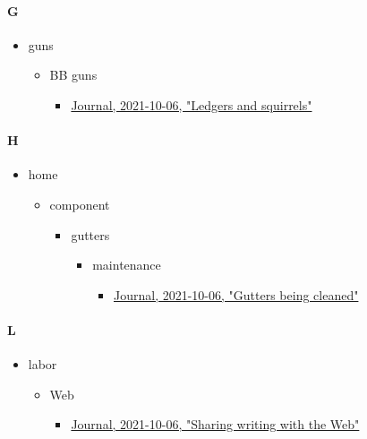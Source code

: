 \documentclass[11pt]{article}
\begin{document}
\paragraph*{G}
\label{sec:orgdc24d9c}
\begin{itemize}
\item guns
\begin{itemize}
\item BB guns
\begin{itemize}
\item \href{emsenn.org}{Journal, 2021-10-06, "Ledgers and squirrels"}
\end{itemize}
\end{itemize}
\end{itemize}
\paragraph*{H}
\label{sec:org058cc9a}
\begin{itemize}
\item home
\begin{itemize}
\item component
\begin{itemize}
\item gutters
\begin{itemize}
\item maintenance
\begin{itemize}
\item \href{emsenn.org}{Journal, 2021-10-06, "Gutters being cleaned"}
\end{itemize}
\end{itemize}
\end{itemize}
\end{itemize}
\end{itemize}
\paragraph*{L}
\label{sec:org8692634}
\begin{itemize}
\item labor
\begin{itemize}
\item Web
\begin{itemize}
\item \href{emsenn.org}{Journal, 2021-10-06, "Sharing writing with the Web"}
\end{itemize}
\end{itemize}
\end{itemize}
\stopcontents[level-1]
\end{document}

